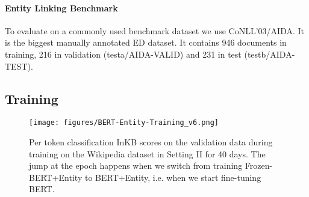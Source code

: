 \documentclass[11pt,a4paper]{article}
\begin{document}
\paragraph{Entity Linking Benchmark}

To evaluate on a commonly used benchmark dataset we use CoNLL’03/AIDA. It is the biggest manually annotated ED dataset. It contains 946 documents in training, 216 in validation (testa/AIDA-VALID) and 231 in test (testb/AIDA-TEST).


\subsection{Training}

\begin{figure}
	\centering
	\texttt{[image: figures/BERT-Entity-Training\_v6.png]}
	\caption{Per token classification InKB scores on the validation data during training on the Wikipedia dataset in Setting II for 40 days. The jump at the  epoch happens when we switch from training Frozen-BERT+Entity to BERT+Entity, i.e. when we start fine-tuning BERT.}
	\label{fig:training}
\end{figure}
\end{document}
